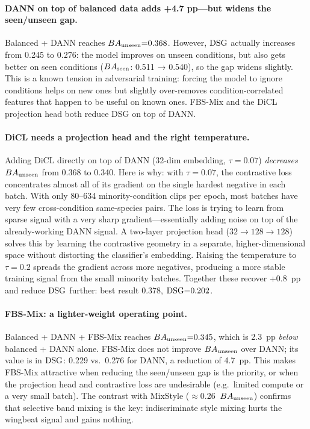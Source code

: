\paragraph{DANN on top of balanced data adds +4.7 pp---but widens
the seen/unseen gap.}
Balanced + DANN reaches $BA_{\text{unseen}}{=}0.368$.
However, $\mathrm{DSG}$ actually increases from 0.245 to 0.276: the model
improves on unseen conditions, but also gets better on seen conditions
($BA_{\text{seen}}$: 0.511 → 0.540), so the gap widens slightly.
This is a known tension in adversarial training: forcing the model to
ignore conditions helps on new ones but slightly over-removes
condition-correlated features that happen to be useful on known ones.
FBS-Mix and the DiCL projection head both reduce DSG on top of DANN.

\paragraph{DiCL needs a projection head and the right temperature.}
Adding DiCL directly on top of DANN (32-dim embedding, $\tau{=}0.07$)
\emph{decreases} $BA_{\text{unseen}}$ from 0.368 to 0.340.
Here is why: with $\tau{=}0.07$, the contrastive loss concentrates
almost all of its gradient on the single hardest negative in each
batch.
With only 80--634 minority-condition clips per epoch, most batches
have very few cross-condition same-species pairs.
The loss is trying to learn from sparse signal with a very sharp
gradient---essentially adding noise on top of the already-working
DANN signal.
A two-layer projection head ($32{\to}128{\to}128$) solves this by
learning the contrastive geometry in a separate, higher-dimensional
space without distorting the classifier's embedding.
Raising the temperature to $\tau{=}0.2$ spreads the gradient across
more negatives, producing a more stable training signal from the
small minority batches.
Together these recover +0.8~pp and reduce $\mathrm{DSG}$ further: best
result 0.378, $\mathrm{DSG}{=}0.202$.

\paragraph{FBS-Mix: a lighter-weight operating point.}
Balanced + DANN + FBS-Mix reaches $BA_{\text{unseen}}{=}0.345$, which is 2.3~pp
\emph{below} balanced + DANN alone.
FBS-Mix does not improve $BA_{\text{unseen}}$ over DANN; its value is in
$\mathrm{DSG}$: 0.229 vs.\ 0.276 for DANN, a reduction of 4.7~pp.
This makes FBS-Mix attractive when reducing the seen/unseen gap is
the priority, or when the projection head and contrastive loss are
undesirable (e.g.\ limited compute or a very small batch).
The contrast with MixStyle ($\approx$0.26~$BA_{\text{unseen}}$) confirms that
selective band mixing is the key: indiscriminate style mixing hurts
the wingbeat signal and gains nothing.

